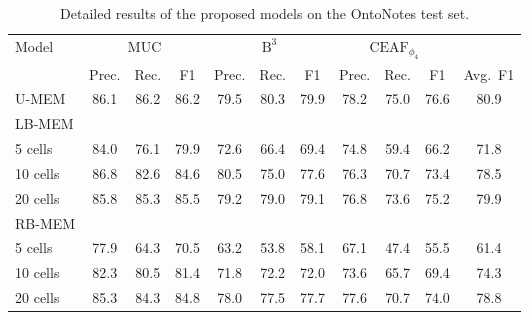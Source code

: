 \documentclass[12pt]{thesis-umich}[thesis]
\newcommand{\unbounded}{U-MEM\xspace}
\newcommand{\learned}{LB-MEM\xspace}
\newcommand{\lru}{RB-MEM\xspace}
\begin{document}
\begin{table*}[!ht]
{\begin{tabular}{l c c c c c c c c c c}
\toprule
Model & \multicolumn{3}{c}{MUC} & \multicolumn{3}{c}{$\text{B}^3$} & \multicolumn{3}{c}{$\text{CEAF}_{\phi_4}$} & \\
 & Prec. & Rec. & F1 & Prec. & Rec. & F1 & Prec. & Rec. & F1 & Avg.\ F1\\\midrule
 \unbounded   
 & 86.1 & 86.2 & 86.2  & 79.5 & 80.3 & 79.9  & 78.2 & 75.0 & 76.6 
&  80.9\\
\learned \\
\hspace{0.1in} 5 cells 
    & 84.0 & 76.1 & 79.9  & 72.6 & 66.4 & 69.4  & 74.8 & 59.4 & 66.2
&  71.8 \\
\hspace{0.1in} 10 cells 
 & 86.8 & 82.6 & 84.6  & 80.5 & 75.0 & 77.6  & 76.3 & 70.7 & 73.4 &  78.5 \\
\hspace{0.1in} 20 cells 
& 85.8 & 85.3 & 85.5  & 79.2 & 79.0 & 79.1  & 76.8 & 73.6 & 75.2 &  79.9\\
\lru \\
\hspace{0.1in} 5 cells & 77.9 & 64.3 & 70.5  & 63.2 & 53.8 & 58.1  & 67.1 & 47.4 & 55.5 &  61.4\\
\hspace{0.1in} 10 cells & 82.3 & 80.5 & 81.4  & 71.8 & 72.2 & 72.0  & 73.6 & 65.7 & 69.4 
&  74.3 \\
\hspace{0.1in} 20 cells  & 85.3 & 84.3 & 84.8  & 78.0 & 77.5 & 77.7  & 77.6 & 70.7 & 74.0 
&  78.8 \\
\bottomrule
\end{tabular}
}
\caption{Detailed results of the proposed models on the OntoNotes test set.}
\label{tab:full_ontonotes}
\end{table*} 
\end{document}
